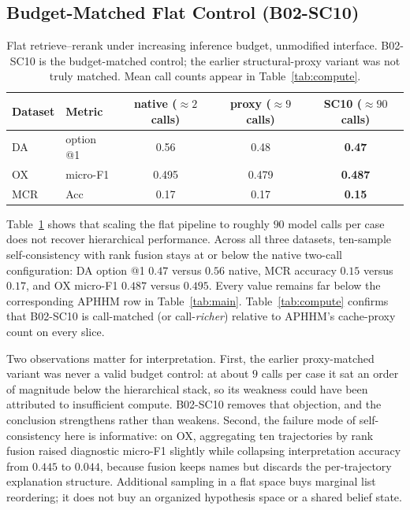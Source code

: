 \subsection{Budget-Matched Flat Control (B02-SC10)}
\label{sec:rq4}

\begin{table}[t]
\centering
\small
\caption{Flat retrieve--rerank under increasing inference budget, unmodified interface. B02-SC10 is the budget-matched control; the earlier structural-proxy variant was not truly matched. Mean call counts appear in Table~\ref{tab:compute}.}
\label{tab:budget}
\begin{tabular}{llccc}
\toprule
Dataset & Metric & native ($\approx2$ calls) & proxy ($\approx9$ calls) & \textbf{SC10} ($\approx90$ calls) \\
\midrule
DA & option @1 & 0.56 & 0.48 & \textbf{0.47} \\
OX & micro-F1 & 0.495 & 0.479 & \textbf{0.487} \\
MCR & Acc & 0.17 & 0.17 & \textbf{0.15} \\
\bottomrule
\end{tabular}
\end{table}

Table~\ref{tab:budget} shows that scaling the flat pipeline to roughly $90$ model calls per case does not recover hierarchical performance.
Across all three datasets, ten-sample self-consistency with rank fusion stays at or below the native two-call configuration: DA option @1 $0.47$ versus $0.56$ native, MCR accuracy $0.15$ versus $0.17$, and OX micro-F1 $0.487$ versus $0.495$.
Every value remains far below the corresponding APHHM row in Table~\ref{tab:main}.
Table~\ref{tab:compute} confirms that B02-SC10 is call-matched (or call-\emph{richer}) relative to APHHM's cache-proxy count on every slice.

Two observations matter for interpretation.
First, the earlier proxy-matched variant was never a valid budget control: at about $9$ calls per case it sat an order of magnitude below the hierarchical stack, so its weakness could have been attributed to insufficient compute.
B02-SC10 removes that objection, and the conclusion strengthens rather than weakens.
Second, the failure mode of self-consistency here is informative: on OX, aggregating ten trajectories by rank fusion raised diagnostic micro-F1 slightly while collapsing interpretation accuracy from $0.445$ to $0.044$, because fusion keeps names but discards the per-trajectory explanation structure.
Additional sampling in a flat space buys marginal list reordering; it does not buy an organized hypothesis space or a shared belief state.


